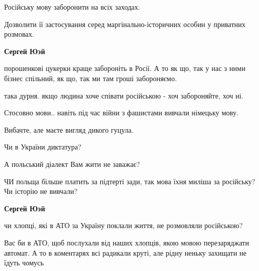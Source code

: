 \begin{itemize}
\begin{itemize}
\begin{itemize}
\end{itemize}

 

Російську мову заборонити на всіх заходах.

Дозволити її застосування серед маргінально-історичних особин у приватних
розмовах.

\begin{itemize}
 
\textbf{Сергей Юэй} 

порошенкові цукерки краще забороніть в Росії. А то як що, так у нас з ними
бізнес спільний, як що, так ми там гроші забороняємо.

така дурня. якщо людина хоче співати російською - хоч забороняйте, хоч ні.

Стосовно мови.. навіть під час війни з фашистами вивчали німецьку мову.

Вибачте, але маєте вигляд дикого гуцула.

Чи в України диктатура?

А польський діалект Вам жити не заважає?

ЧИ польща більше платить за підтерті зади, так мова їхня миліша за російську?
Чи історію не вивчали?

 
\textbf{Сергей Юэй} 

чи хлопці, які в АТО за Україну поклали життя, не розмовляли російською?

Вас би в АТО, щоб послухали від наших хлопців, якою мовою перезаряджати
автомат. А то в коментарях всі радикали круті, але рідну неньку захищати не
їдуть чомусь


 

\end{itemize}
\end{itemize}
\end{itemize}
